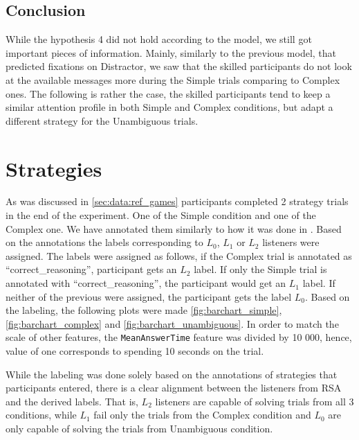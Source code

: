 \subsection*{Conclusion}
\label{sec:avmsgs_conclusion}
While the hypothesis 4 did not hold according to the model, we still got important pieces of information. Mainly, similarly to the previous model, that predicted fixations on Distractor, we saw that the skilled participants do not look at the available messages more during the Simple trials comparing to Complex ones. The following is rather the case, the skilled participants tend to keep a similar attention profile in both Simple and Complex conditions, but adapt a different strategy for the Unambiguous trials. 









\section{Strategies}

As was discussed in \autoref{sec:data:ref_games} participants completed 2 strategy trials in the end of the experiment. One of the Simple condition and one of the Complex one. We have annotated them similarly to how it was done in \cite{Mayn_2023}. Based on the annotations the labels corresponding to $L_0$, $L_1$ or $L_2$ listeners were assigned. The labels were assigned as follows, if the Complex trial is annotated as ``correct\_reasoning'', participant gets an $L_2$ label. If only the Simple trial is annotated with ``correct\_reasoning'', the participant would get an $L_1$ label. If neither of the previous were assigned, the participant gets the label $L_0$. Based on the labeling, the following plots were made \autoref{fig:barchart_simple}, \autoref{fig:barchart_complex} and \autoref{fig:barchart_unambiguous}. In order to match the scale of other features, the \texttt{MeanAnswerTime} feature was divided by 10 000, hence, value of one corresponds to spending 10 seconds on the trial.

While the labeling was done solely based on the annotations of strategies that participants entered, there is a clear alignment between the listeners from RSA and the derived labels. That is, $L_2$ listeners are capable of solving trials from all 3 conditions, while $L_1$ fail only the trials from the Complex condition and $L_0$ are only capable of solving the trials from Unambiguous condition. 

